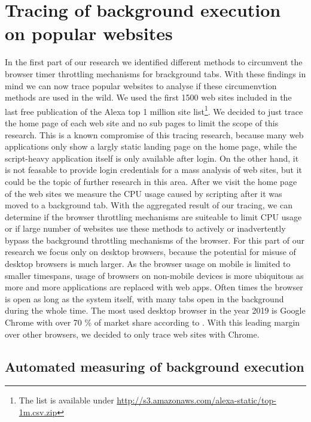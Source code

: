 \documentclass[
	ruledheaders=section,%
	class=report,%
	thesis={type=bachelor},%
	accentcolor=9c,%
	custommargins=true,%
	marginpar=false,%
	parskip=half-,%
	fontsize=11pt,%
]{tudapub}
\begin{document}
 

  \newpage
  \chapter{Tracing of background execution on popular websites}
  \label{chap:tracing}

  In the first part of our research we identified different methods to circumvent the browser timer throttling mechanisms for brackground tabs. With these findings in mind we can now trace popular websites to analyse if these circumenvtion methods are used in the wild. We used the first 1500 web sites included in the last free publication of the Alexa top 1 million site list\footnote{The list is available under \url{http://s3.amazonaws.com/alexa-static/top-1m.csv.zip}}. We decided to just trace the home page of each web site and no sub pages to limit the scope of this research. This is a known compromise of this tracing research, because many web applications only show a largly static landing page on the home page, while the script-heavy application itself is only available after login. On the other hand, it is not feasable to provide login credentials for a mass analysis of web sites, but it could be the topic of further research in this area. After we visit the home page of the web sites we measure the CPU usage caused by scripting after it was moved to a background tab. With the aggregated result of our tracing, we can determine if the browser throttling mechanisms are suiteable to limit CPU usage or if large number of websites use these methods to actively or inadvertently bypass the background throttling mechanisms of the browser. For this part of our research we focus only on desktop browsers, because the potential for misuse of desktop browsers is much larger. As the browser usage on mobile is limited to smaller timespans, usage of browsers on non-mobile devices is more ubiquitous as more and more applications are replaced with web apps. Often times the browser is open as long as the system itself, with many tabs open in the background during the whole time. The most used desktop browser in the year 2019 is Google Chrome with over 70 \% of market share according to \cite{statcounter-desktop-browser-market-share}. With this leading margin over other browsers, we decided to only trace web sites with Chrome.
  
  \section{Automated measuring of background execution}
\end{document}
